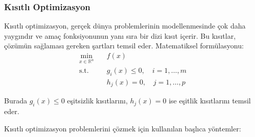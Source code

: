 \subsubsection{Kısıtlı Optimizasyon}
Kısıtlı optimizasyon, gerçek dünya problemlerinin modellenmesinde çok daha yaygındır ve amaç fonksiyonunun yanı sıra bir dizi kısıt içerir. Bu kısıtlar, çözümün sağlaması gereken şartları temsil eder. Matematiksel formülasyonu:
\begin{equation}
\begin{aligned}
\min_{x \in \mathbb{R}^n} & \quad f(x) \\
\text{s.t.} & \quad g_i(x) \leq 0, \quad i = 1,\ldots,m \\
& \quad h_j(x) = 0, \quad j = 1,\ldots,p
\end{aligned}
\end{equation}

Burada $g_i(x) \leq 0$ eşitsizlik kısıtlarını, $h_j(x) = 0$ ise eşitlik kısıtlarını temsil eder.


Kısıtlı optimizasyon problemlerini çözmek için kullanılan başlıca yöntemler:

